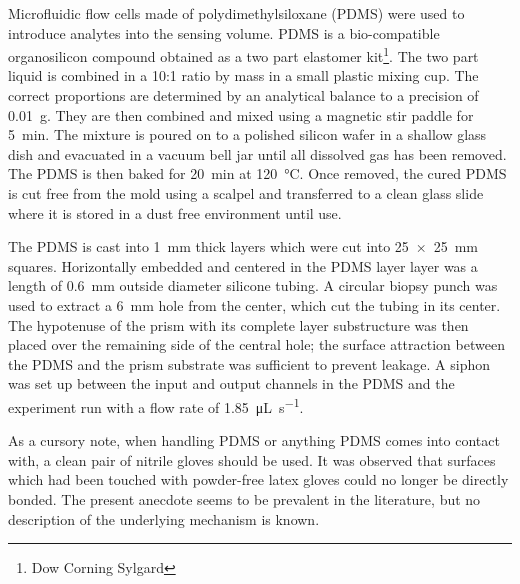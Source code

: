 Microfluidic flow cells made of polydimethylsiloxane (PDMS) were used to
introduce analytes into the sensing volume.  PDMS is a bio-compatible
organosilicon compound obtained as a two part elastomer kit\footnote{Dow
Corning Sylgard}.  The two part liquid is combined in a
10:1 ratio by mass in a small plastic mixing cup.  The correct proportions
are determined by an analytical balance to a precision of \SI{0.01}{\gram}.
They are then combined and mixed using a magnetic stir paddle for
\SI{5}{\minute}.  The mixture is poured on to a polished silicon wafer in a
shallow glass dish and evacuated in a vacuum bell jar until all dissolved
gas has been removed.  The PDMS is then baked for \SI{20}{\minute} at
\SI{120}{\celsius}.  Once removed, the cured PDMS is cut free from the mold
using a scalpel and transferred to a clean glass slide where it is stored
in a dust free environment until use.

The PDMS is cast into \SI{1}{\milli\meter} thick layers which were cut into
\SI{25x25}{\milli\meter} squares.  Horizontally embedded and centered in
the PDMS layer layer was a length of \SI{0.6}{\milli\meter} outside
diameter silicone tubing.  A circular biopsy punch was used to extract a
\SI{6}{\milli\meter} hole from the center, which cut the tubing in its
center.  The hypotenuse of the prism with its complete layer substructure
was then placed over the remaining side of the central hole; the surface
attraction between the PDMS and the prism substrate was sufficient to
prevent leakage.  A siphon was set up between the input and output channels
in the PDMS and the experiment run with a flow rate of
\SI{1.85}{\micro\liter\per\second}.  

As a cursory note, when handling PDMS or anything PDMS comes into contact
with, a clean pair of nitrile gloves should be used.  It was observed that
surfaces which had been touched with powder-free latex gloves could no
longer be directly bonded.  The present anecdote seems to be prevalent in
the literature, but no description of the underlying mechanism is known.
